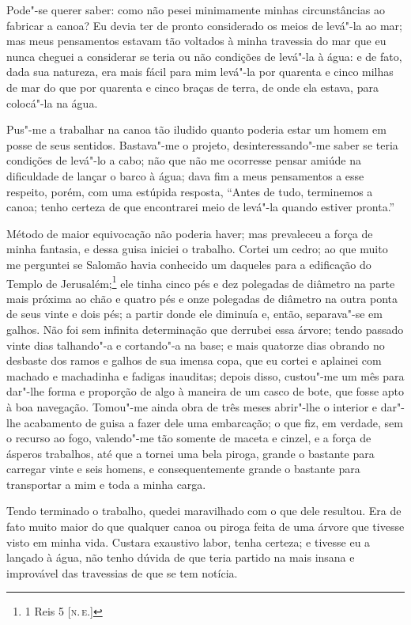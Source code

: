 Pode"-se querer saber: como não pesei minimamente minhas circunstâncias
ao fabricar a canoa? Eu devia ter de pronto considerado os meios de
levá"-la ao mar; mas meus pensamentos estavam tão voltados à minha
travessia do mar que eu nunca cheguei a considerar se teria ou não
condições de levá"-la à água: e de fato, dada sua natureza, era mais
fácil para mim levá"-la por quarenta e cinco milhas de mar do que por
quarenta e cinco braças de terra, de onde ela estava, para colocá"-la na
água.

Pus"-me a trabalhar na canoa tão iludido quanto poderia estar um homem em
posse de seus sentidos. Bastava"-me o projeto, desinteressando"-me saber
se teria condições de levá"-lo a cabo; não que não me ocorresse pensar
amiúde na dificuldade de lançar o barco à água; dava fim a meus
pensamentos a esse respeito, porém, com uma estúpida resposta, ``Antes
de tudo, terminemos a canoa; tenho certeza de que encontrarei meio de
levá"-la quando estiver pronta.''

Método de maior equivocação não poderia haver; mas prevaleceu a força de
minha fantasia, e dessa guisa iniciei o trabalho. Cortei um cedro; ao
que muito me perguntei se Salomão havia conhecido um daqueles para a
edificação do Templo de Jerusalém;\footnote{1 Reis 5 {[}\textsc{n.\,e.}{]}} ele
tinha cinco pés e dez polegadas de diâmetro na parte mais próxima ao
chão e quatro pés e onze polegadas de diâmetro na outra ponta de seus
vinte e dois pés; a partir donde ele diminuía e, então, separava"-se em
galhos. Não foi sem infinita determinação que derrubei essa árvore;
tendo passado vinte dias talhando"-a e cortando"-a na base; e mais
quatorze dias obrando no desbaste dos ramos e galhos de sua imensa copa,
que eu cortei e aplainei com machado e machadinha e fadigas inauditas;
depois disso, custou"-me um mês para dar"-lhe forma e proporção de algo à
maneira de um casco de bote, que fosse apto à boa navegação. Tomou"-me
ainda obra de três meses abrir"-lhe o interior e dar"-lhe acabamento de
guisa a fazer dele uma embarcação; o que fiz, em verdade, sem o recurso
ao fogo, valendo"-me tão somente de maceta e cinzel, e a força de ásperos
trabalhos, até que a tornei uma bela piroga, grande o bastante para
carregar vinte e seis homens, e consequentemente grande o bastante para
transportar a mim e toda a minha carga.

Tendo terminado o trabalho, quedei maravilhado com o que dele resultou.
Era de fato muito maior do que qualquer canoa ou piroga feita de uma
árvore que tivesse visto em minha vida. Custara exaustivo labor, tenha
certeza; e tivesse eu a lançado à água, não tenho dúvida de que teria
partido na mais insana e improvável das travessias de que se tem
notícia.

